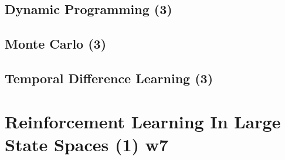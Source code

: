 \subsection{Dynamic Programming (3)}
\label{subsec:dp}

\subsection{Monte Carlo (3)}
\label{subsec:mc}

\subsection{Temporal Difference Learning (3)}
\label{subsec:td}


\section{Reinforcement Learning In Large State Spaces (1) w7}
\label{sec:rlLargeStateSpace}